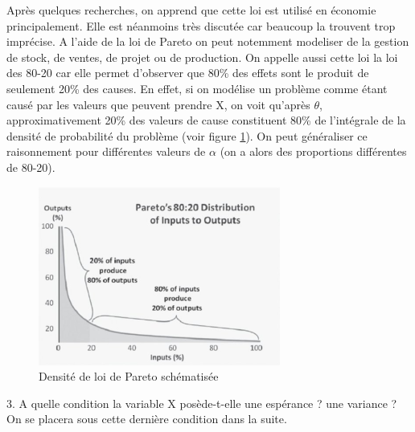 \documentclass{article}
\begin{document}
Après quelques recherches, on apprend que cette loi est utilisé en
économie principalement. Elle est néanmoins très discutée car beaucoup
la trouvent trop imprécise. A l'aide de la loi de Pareto on peut notemment
modeliser de la gestion de stock, de ventes, de projet ou de production.
On appelle aussi cette loi la loi des 80-20 car elle permet d'observer
que 80\% des effets sont le produit de seulement 20\% des causes.
En effet, si on modélise un problème comme étant causé par les valeurs
que peuvent prendre X, on voit qu'après $\theta$, approximativement
20\% des valeurs de cause constituent 80\% de l'intégrale de la densité
de probabilité du problème (voir figure \ref{fig:schema-densite}).
On peut généraliser ce raisonnement pour différentes valeurs de $\alpha$
(on a alors des proportions différentes de 80-20).
\clearpage
\begin{figure}
\caption{Densité de loi de Pareto schématisée\label{fig:schema-densite}}

\centering{}\includegraphics{schema_loi}
\end{figure}
3. A quelle condition la variable X posède-t-elle une espérance ?
une variance ? On se placera sous cette dernière condition dans la
suite.
\end{document}
